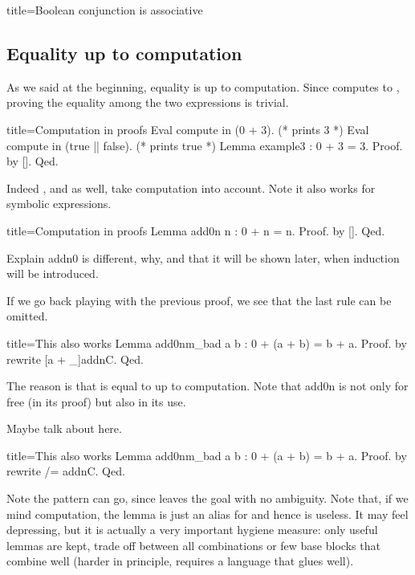 \begin{coq}{title=Boolean conjunction is associative}
\subsection{Equality up to computation}

As we said at the beginning, equality is up to computation.
Since  computes to , proving the equality among
the two expressions is trivial.

\begin{coq}{title=Computation in proofs}
Eval compute in (0 + 3).  (* prints 3 *)
Eval compute in (true || false).  (* prints true *)
Lemma example3 : 0 + 3 = 3.
Proof. by []. Qed.
\end{coq}

Indeed , and  as well, take computation
into account.
Note it also works for symbolic expressions.

\begin{coq}{title=Computation in proofs}
Lemma add0n n : 0 + n = n.
Proof. by []. Qed.
\end{coq}

Explain addn0 is different, why, and that it will be shown later,
when induction will be introduced.

If we go back playing with the previous proof, we see that the
last rule can be omitted.

\begin{coq}{title=This also works}
Lemma add0nm_bad a b : 0 + (a + b) = b + a.
Proof. by rewrite [a + _]addnC. Qed.
\end{coq}

The reason is that  is equal
to  up to computation.
Note that add0n  is not only for free (in its proof) but
also in its use.

Maybe talk about \C{/=} here.

\begin{coq}{title=This also works}
Lemma add0nm_bad a b : 0 + (a + b) = b + a.
Proof. by rewrite /= addnC. Qed.
\end{coq}

Note the pattern can go, since \C{/=} leaves the goal with
no ambiguity.
Note that, if we mind computation, the lemma is just an alias
for  and hence is useless.  It may feel depressing, but
it is actually a very important hygiene measure: only useful lemmas
are kept, trade off between all combinations or few base blocks that
combine well (harder in principle, requires a language that glues well).




\end{coq}
